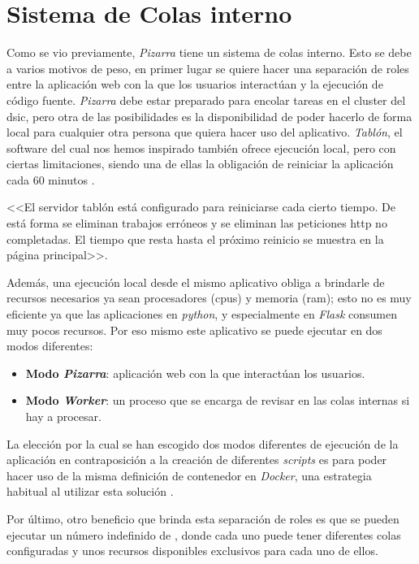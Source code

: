 \documentclass[11pt,spanish,listoffigures,listoftables]{tfgetsinf}
\begin{document}
\section{Sistema de Colas  interno}

Como se vio previamente, \textit{Pizarra} tiene un sistema de \Gls{cola}s interno. Esto se debe a varios motivos de peso, en primer lugar se quiere hacer una separación de roles entre la aplicación web con la que los usuarios interactúan y la ejecución de código fuente. \textit{Pizarra} debe estar preparado para encolar tareas en el cluster \kahan del \acrshort{dsic}, pero otra de las posibilidades es la disponibilidad de poder hacerlo de forma local para cualquier otra persona que quiera hacer uso del aplicativo. \textit{Tablón}, el software del cual nos hemos inspirado también ofrece ejecución local, pero con ciertas limitaciones, siendo una de ellas la obligación de reiniciar la aplicación cada 60 minutos \cite{link-tablon-faq}.

<<El servidor tablón está configurado para reiniciarse cada cierto tiempo. De está forma se eliminan trabajos erróneos y se eliminan las peticiones http no completadas. El tiempo que resta hasta el próximo reinicio se muestra en la página principal>>.

Además, una ejecución local desde el mismo aplicativo obliga a brindarle de recursos necesarios ya sean procesadores (\acrshort{cpu}s) y memoria (\acrshort{ram}); esto no es muy eficiente ya que las aplicaciones en \textit{python}, y especialmente en \textit{Flask} consumen muy pocos recursos. Por eso mismo este aplicativo se puede ejecutar en dos modos diferentes:

\begin{itemize}
	\item \textbf{Modo \textit{Pizarra}}: aplicación web con la que interactúan los usuarios.
	\item \textbf{Modo \textit{Worker}}: un proceso que se encarga de revisar en las \gls{cola}s internas si hay  a procesar.
\end{itemize}

La elección por la cual se han escogido dos modos diferentes de ejecución de la aplicación en contraposición a la creación de diferentes \textit{scripts} es para poder hacer uso de la misma definición de contenedor en \textit{Docker}, una estrategia habitual al utilizar esta solución \cite{link-sharing-docker-containers}.

Por último, otro beneficio que brinda esta separación de roles es que se pueden ejecutar un número indefinido de , donde cada uno puede tener diferentes colas configuradas y unos recursos disponibles exclusivos para cada uno de ellos.
\end{document}
